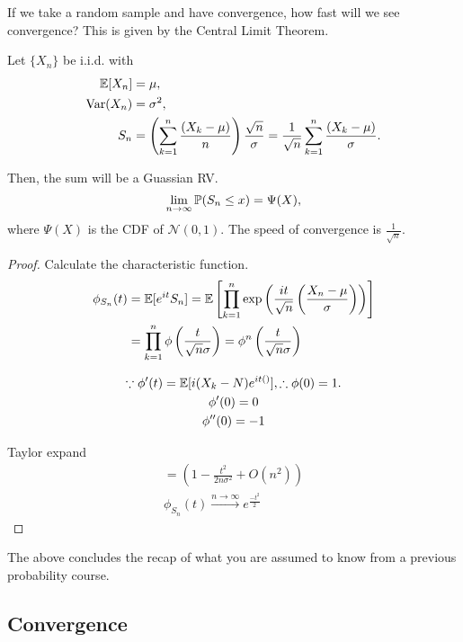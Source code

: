 If we take a random sample and have convergence, how fast will we see convergence? This is given by the Central Limit Theorem. 

Let $\{X_n\}$ be i.i.d. with 
\[\begin{aligned}
	\mathbb{E}[X_n] &= \mu, \\
	\text{Var}(X_n) &= \sigma^2, \\
	S_n &= \left(\sum\limits_{k=1}^n \frac{(X_k - \mu)}{n} \right) \frac{\sqrt{n}}{\sigma}
		= \frac{1}{\sqrt{n}} \sum\limits_{k=1}^n \frac{(X_k - \mu)}{\sigma}.
\end{aligned}\]

Then, the sum will be a Guassian RV. 
\[ \lim\limits_{n\to \infty} \mathbb{P}(S_n \leq x)  = \Psi(X),\] where $\Psi(X)$ is the CDF of $\mathcal{N}(0, 1)$. The speed of convergence is $\frac{1}{\sqrt{n}}$. 

\begin{proof}
	Calculate the characteristic function. 
	\[\begin{aligned}
		\phi_{S_n}(t) &= \mathbb{E}[e^{it}S_n] 
			= \mathbb{E}\left[\prod\limits_{k=1}^n 
				\exp\left(
					\frac{it}{\sqrt{n}} \left(
						\frac{X_n - \mu}{\sigma}
						\right) 
					\right) 
				\right] \\ 
		&= \prod\limits_{k=1}^n \phi\left(\frac{t}{\sqrt{n}\sigma}\right)
		= \phi^n \left(\frac{t}{\sqrt{n}\sigma}\right)
	\end{aligned}
	\]

	\begin{gather*}
		\because \phi'(t) = \mathbb{E}[i(X_k - N) e^{it()}], \therefore \phi(0) = 1. \\
		\phi'(0) = 0 \\
		\phi''(0) = -1 
	\end{gather*}

	Taylor expand
	\begin{align*}
		= (1 - \frac{t^2}{2n\sigma^2}  + O(n^2)) \\
		\phi_{S_n}(t) \xrightarrow[]{n\to\infty} e^{ \frac{ -t^2 }{ 2 } }
	\end{align*}

\end{proof}

The above concludes the recap of what you are assumed to know from a previous probability course. 


\subsection{Convergence}

